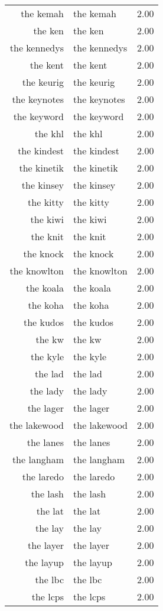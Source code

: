 \begin{table}[ht]
\begin{tabular}{rlr}
  the kemah & the kemah & 2.00 \\ 
  the ken & the ken & 2.00 \\ 
  the kennedys & the kennedys & 2.00 \\ 
  the kent & the kent & 2.00 \\ 
  the keurig & the keurig & 2.00 \\ 
  the keynotes & the keynotes & 2.00 \\ 
  the keyword & the keyword & 2.00 \\ 
  the khl & the khl & 2.00 \\ 
  the kindest & the kindest & 2.00 \\ 
  the kinetik & the kinetik & 2.00 \\ 
  the kinsey & the kinsey & 2.00 \\ 
  the kitty & the kitty & 2.00 \\ 
  the kiwi & the kiwi & 2.00 \\ 
  the knit & the knit & 2.00 \\ 
  the knock & the knock & 2.00 \\ 
  the knowlton & the knowlton & 2.00 \\ 
  the koala & the koala & 2.00 \\ 
  the koha & the koha & 2.00 \\ 
  the kudos & the kudos & 2.00 \\ 
  the kw & the kw & 2.00 \\ 
  the kyle & the kyle & 2.00 \\ 
  the lad & the lad & 2.00 \\ 
  the lady & the lady & 2.00 \\ 
  the lager & the lager & 2.00 \\ 
  the lakewood & the lakewood & 2.00 \\ 
  the lanes & the lanes & 2.00 \\ 
  the langham & the langham & 2.00 \\ 
  the laredo & the laredo & 2.00 \\ 
  the lash & the lash & 2.00 \\ 
  the lat & the lat & 2.00 \\ 
  the lay & the lay & 2.00 \\ 
  the layer & the layer & 2.00 \\ 
  the layup & the layup & 2.00 \\ 
  the lbc & the lbc & 2.00 \\ 
  the lcps & the lcps & 2.00 \\ 

\end{tabular}
\end{table}

